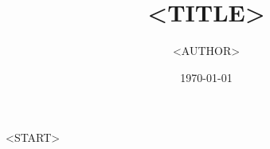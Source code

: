 \documentclass[12pt,t]{beamer}
\title{<TITLE>}
\subtitle{}
\author{<AUTHOR>}
\institute{}
\date[]{\today}
\begin{document}
\frame[plain]{\titlepage}

<START>
\end{document}
